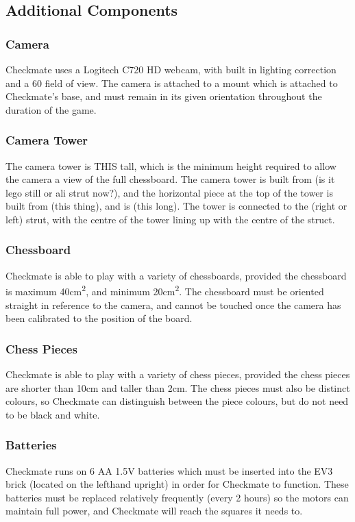 \documentclass[onecolumn]{IEEEtran}
\begin{document}
\subsection{Additional Components}
\subsubsection{Camera}
Checkmate uses a Logitech C720 HD webcam, with built in lighting correction and a 60\textdegree\: field of view. The camera is attached to a mount which is attached to Checkmate's base, and must remain in its given orientation throughout the duration of the game. 
\subsubsection{Camera Tower}
The camera tower is THIS tall, which is the minimum height required to allow the camera a view of the full chessboard. The camera tower is built from (is it lego still or ali strut now?), and the horizontal piece at the top of the tower is built from (this thing), and is (this long). The tower is connected to the (right or left) strut, with the centre of the tower lining up with the centre of the struct. 
\subsubsection{Chessboard}
Checkmate is able to play with a variety of chessboards, provided the chessboard is maximum 40cm\textsuperscript{2}, and minimum 20cm\textsuperscript{2}. The chessboard must be oriented straight in reference to the camera, and cannot be touched once the camera has been calibrated to the position of the board. 
\subsubsection{Chess Pieces}
Checkmate is able to play with a variety of chess pieces, provided the chess pieces are shorter than 10cm and taller than 2cm. The chess pieces must also be distinct colours, so Checkmate can distinguish between the piece colours, but do not need to be black and white. 
\subsubsection{Batteries}
Checkmate runs on 6 AA 1.5V batteries which must be inserted into the EV3 brick (located on the lefthand upright) in order for Checkmate to function. These batteries must be replaced relatively frequently (\texttildelow every 2 hours) so the motors can maintain full power, and Checkmate will reach the squares it needs to. 
\end{document}
